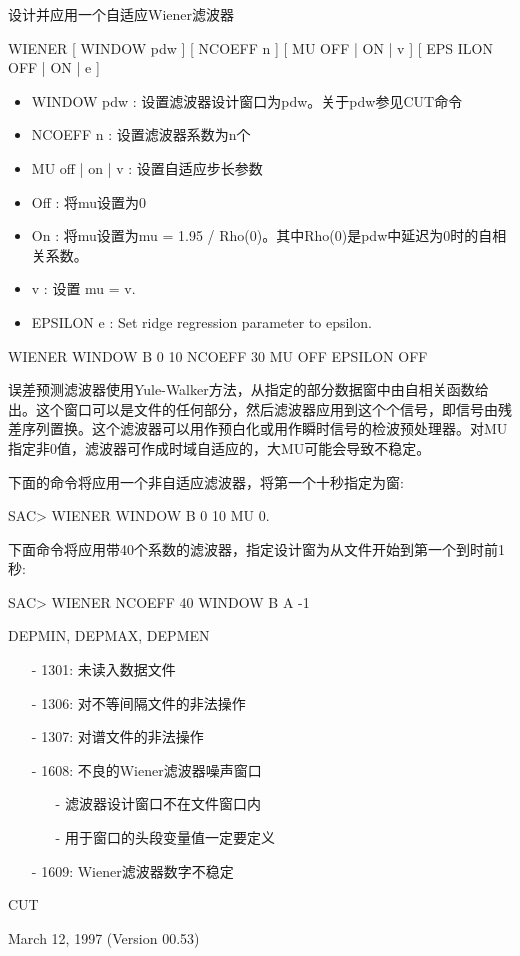 \label{cmd:wiener}

设计并应用一个自适应Wiener滤波器

WIENER [ WINDOW pdw ] [ NCOEFF n ] [ MU OFF | ON | v ] [ EPS ILON OFF | ON | e ]

\begin{itemize}
\item WINDOW pdw : 设置滤波器设计窗口为pdw。关于pdw参见CUT命令 
\item NCOEFF n : 设置滤波器系数为n个 
\item MU off | on | v : 设置自适应步长参数 
\item Off : 将mu设置为0 
\item On : 将mu设置为mu = 1.95 / Rho(0)。其中Rho(0)是pdw中延迟为0时的自相关系数。 
\item v : 设置 mu = v. 
\item EPSILON e :  Set ridge regression parameter to epsilon. 
\end{itemize}

WIENER WINDOW B 0 10 NCOEFF 30 MU OFF EPSILON OFF

误差预测滤波器使用Yule-Walker方法，从指定的部分数据窗中由自相关函数给出。这个窗口可以是文件的任何部分，然后滤波器应用到这个个信号，即信号由残差序列置换。这个滤波器可以用作预白化或用作瞬时信号的检波预处理器。对MU指定非0值，滤波器可作成时域自适应的，大MU可能会导致不稳定。

下面的命令将应用一个非自适应滤波器，将第一个十秒指定为窗:
\begin{SACCode}
SAC> WIENER WINDOW B 0 10 MU 0.
\end{SACCode}

下面命令将应用带40个系数的滤波器，指定设计窗为从文件开始到第一个到时前1秒:
\begin{SACCode}
SAC> WIENER NCOEFF 40 WINDOW B A -1
\end{SACCode}

DEPMIN, DEPMAX, DEPMEN

\begin{itemize}
\item[-]1301: 未读入数据文件
\item[-]1306: 对不等间隔文件的非法操作
\item[-]1307: 对谱文件的非法操作
\item[-]1608: 不良的Wiener滤波器噪声窗口
	\begin{itemize}
	\item[-]滤波器设计窗口不在文件窗口内
	\item[-]用于窗口的头段变量值一定要定义
	\end{itemize}
\end{itemize}

\begin{itemize}
\item[-]1609: Wiener滤波器数字不稳定
\end{itemize}

CUT

March 12, 1997 (Version 00.53)

